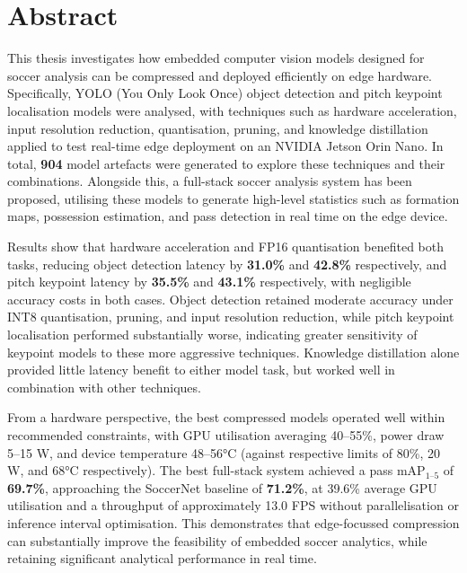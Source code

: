\section{Abstract}
\label{abstract}
This thesis investigates how embedded computer vision models designed for soccer analysis can be compressed and deployed efficiently on edge hardware. Specifically, YOLO (You Only Look Once) object detection and pitch keypoint localisation models were analysed, with techniques such as hardware acceleration, input resolution reduction, quantisation, pruning, and knowledge distillation applied to test real-time edge deployment on an NVIDIA Jetson Orin Nano. In total, \textbf{904} model artefacts were generated to explore these techniques and their combinations. Alongside this, a full-stack soccer analysis system has been proposed, utilising these models to generate high-level statistics such as formation maps, possession estimation, and pass detection in real time on the edge device.

Results show that hardware acceleration and FP16 quantisation benefited both tasks, reducing object detection latency by \textbf{31.0\%} and \textbf{42.8\%} respectively, and pitch keypoint latency by \textbf{35.5\%} and \textbf{43.1\%} respectively, with negligible accuracy costs in both cases. Object detection retained moderate accuracy under INT8 quantisation, pruning, and input resolution reduction, while pitch keypoint localisation performed substantially worse, indicating greater sensitivity of keypoint models to these more aggressive techniques. Knowledge distillation alone provided little latency benefit to either model task, but worked well in combination with other techniques.

From a hardware perspective, the best compressed models operated well within recommended constraints, with GPU utilisation averaging 40--55\%, power draw 5--15 W, and device temperature 48--56°C (against respective limits of 80\%, 20 W, and 68°C respectively). The best full-stack system achieved a pass mAP$_{1\text{--}5}$ of \textbf{69.7\%}, approaching the SoccerNet baseline of \textbf{71.2\%}, at 39.6\% average GPU utilisation and a throughput of approximately 13.0 FPS without parallelisation or inference interval optimisation. This demonstrates that edge-focussed compression can substantially improve the feasibility of embedded soccer analytics, while retaining significant analytical performance in real time. 
